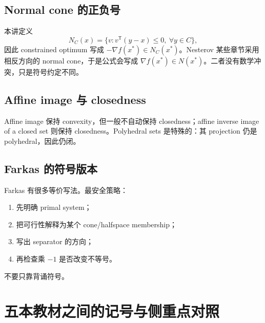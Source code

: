 \documentclass[11pt,a4paper,openany]{ctexrep}
\theoremstyle{definition}
\newcommand{\transpose}{\mathsf{T}}
\begin{document}
\section{Normal cone 的正负号}
本讲定义
\[
N_C(x)=\{v:v^\transpose(y-x)\le0,\ \forall y\in C\},
\]
因此 constrained optimum 写成 $-\nabla f(x^*)\in N_C(x^*)$。Nesterov 某些章节采用相反方向的 normal cone，于是公式会写成 $\nabla f(x^*)\in N(x^*)$。二者没有数学冲突，只是符号约定不同。

\section{Affine image 与 closedness}
Affine image 保持 convexity，但一般不自动保持 closedness；affine inverse image of a closed set 则保持 closedness。Polyhedral sets 是特殊的：其 projection 仍是 polyhedral，因此仍闭。

\section{Farkas 的符号版本}
Farkas 有很多等价写法。最安全策略：
\begin{enumerate}[leftmargin=2em]
  \item 先明确 primal system；
  \item 把可行性解释为某个 cone/halfspace membership；
  \item 写出 separator 的方向；
  \item 再检查乘 $-1$ 是否改变不等号。
\end{enumerate}
不要只靠背诵符号。

\chapter{五本教材之间的记号与侧重点对照}
\end{document}
